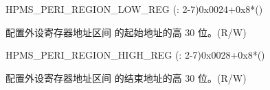 {    \begin{register}{H}{PMS\_PERI\_REGION\_LOW\_REG (: 2-7)}{0x0024+0x8*()}\label{regdesc:PMSPERIREGIONMLOWREG}
    \regnewline%
    \begin{regdesc}\begin{reglist}
    \label{fielddesc:PMSPERIREGIONMLOW}\item [PMS\_PERI\_REGION\regindex{m}\_LOW] 配置外设寄存器地址区间  的起始地址的高 30 位。(R/W)
    \end{reglist}\end{regdesc}
    \end{register}


    \begin{register}{H}{PMS\_PERI\_REGION\_HIGH\_REG (: 2-7)}{0x0028+0x8*()}\label{regdesc:PMSPERIREGIONMHIGHREG}
    \regnewline%
    \begin{regdesc}\begin{reglist}
    \label{fielddesc:PMSPERIREGIONMHIGH}\item [PMS\_PERI\_REGION\regindex{m}\_HIGH] 配置外设寄存器地址区间  的结束地址的高 30 位。(R/W)
    \end{reglist}\end{regdesc}
    \end{register}
}